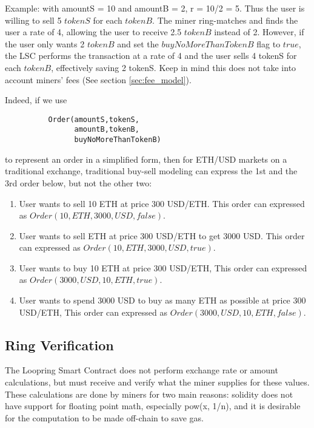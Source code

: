 \documentclass[UTF8,nofonts]{article}
\begin{document}
\begin{multicols}{2}
Example: with amountS = 10 and amountB = 2, r = 10/2 = 5. Thus the user is willing to sell 5 $tokenS$ for each $tokenB$. The miner ring-matches and finds the user a rate of 4, allowing the user to receive 2.5 $tokenB$ instead of 2. However, if the user only wants 2 $tokenB$ and set the $buyNoMoreThanTokenB$ flag to $true$, the LSC performs the transaction at a rate of 4 and the user sells 4 tokenS for each $tokenB$, effectively saving 2 tokenS. Keep in mind this does not take into account miners' fees (See section \ref{sec:fee_model}).

Indeed, if we use

\begin{verbatim}
	      Order(amountS,tokenS,
	            amountB,tokenB,
	            buyNoMoreThanTokenB)
\end{verbatim}

to represent an order in a simplified form, then for ETH/USD markets on a traditional exchange, traditional buy-sell modeling can express the 1st and the 3rd order below, but not the other two:

\begin{enumerate}
	\item User wants to sell 10 ETH at price 300 USD/ETH. This order can expressed as $Order(10, ETH, 3000, USD, false)$.
	\item User wants to sell ETH at price 300 USD/ETH to get 3000 USD. This order can expressed as $Order(10, ETH, 3000, USD, true)$.
	\item User wants to buy 10 ETH at price 300 USD/ETH, This order can expressed as $Order(3000, USD, 10, ETH, true)$.
	\item User wants to spend 3000 USD to buy as many ETH as possible at price 300 USD/ETH, This order can expressed as $Order(3000, USD, 10, ETH, false)$.
\end{enumerate}



\subsection{Ring Verification\label{sec:ring_verification}}

The Loopring Smart Contract does not perform exchange rate or amount calculations, but must receive and verify what the miner supplies for these values. These calculations are done by miners for two main reasons: solidity does not have support for floating point math, especially pow(x, 1/n), and it is desirable for the computation to be made off-chain to save gas.


\end{multicols}
\end{document}
